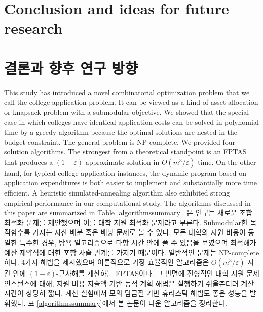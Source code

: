 \documentclass[11pt]{article} %
\theoremstyle{definition}
\theoremstyle{definition}
\begin{document}
\ifen \section{Conclusion and ideas for future research} \else \section{결론과 향후 연구 방향}\fi\label{conclusion}
\ifen
This study has introduced a novel combinatorial optimization problem that we call the college application problem. It can be viewed as a kind of asset allocation or knapsack problem with a submodular objective. We showed that the special case in which colleges have identical application costs can be solved in polynomial time by a greedy algorithm because the optimal solutions are nested in the budget constraint. The general problem is NP-complete. We provided four solution algorithms. The strongest from a theoretical standpoint is an FPTAS that produces a $(1-\varepsilon)$-approximate solution in $O(m^3 / \varepsilon)$-time. On the other hand, for typical college-application instances, the dynamic program based on application expenditures is both easier to implement and substantially more time efficient. A heuristic simulated-annealing algorithm also exhibited strong empirical performance in our computational study. The algorithms discussed in this paper are summarized in Table \ref{algorithmssummary}.
\else
본 연구는 새로운 조합 최적화 문제를 제안했으며 이를 대학 지원 최적화 문제라고 부른다. Submodular한 목적함수를 가지는 자산 배분 혹은 배낭 문제로 볼 수 있다. 모든 대학의 지원 비용이 동일한 특수한 경우, 탐욕 알고리즘으로 다항 시간 안에 풀 수 있음을 보였으며 최적해가 예산 제약식에 대한 포함 사슬 관계를 가지기 때문이다. 일반적인 문제는 NP-complete하다. 4가지 해법을 제시했으며 이론적으로 가장 효율적인 알고리즘은 $O(m^3 / \varepsilon)$-시간 안에  $(1-\varepsilon)$-근사해를 계산하는 FPTAS이다. 그 반면에 전형적인 대학 지원 문제 인스턴스에 대해, 지원 비용 지출액 기반 동적 계획 해법은 실행하기 쉬울뿐더러 계산 시간이 상당히 짧다. 계산 실험에서 모의 담금질 기반 휴리스틱 해법도 좋은 성능을 발휘했다. 표 \ref{algorithmssummary}에서 본 논문이 다운 알고리즘을 정리한다.
\fi
\end{document}
